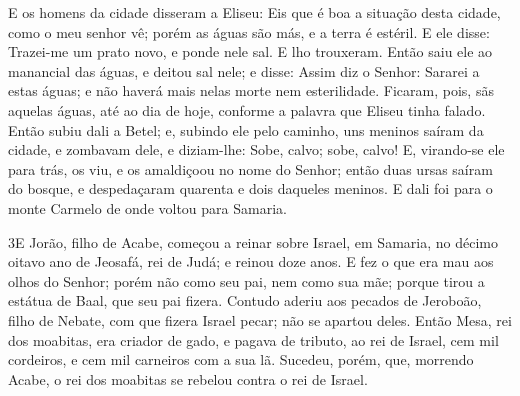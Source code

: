E os homens da cidade disseram a Eliseu: Eis que é boa a situação
desta cidade, como o meu senhor vê; porém as águas são más, e a
terra é estéril. E ele disse: Trazei-me um prato novo, e
ponde nele sal. E lho trouxeram. Então saiu ele ao manancial
das águas, e deitou sal nele; e disse: Assim diz o Senhor: Sararei a
estas águas; e não haverá mais nelas morte nem esterilidade.
Ficaram, pois, sãs aquelas águas, até ao dia de hoje,
conforme a palavra que Eliseu tinha falado. Então subiu dali
a Betel; e, subindo ele pelo caminho, uns meninos saíram da cidade,
e zombavam dele, e diziam-lhe: Sobe, calvo; sobe, calvo! E,
virando-se ele para trás, os viu, e os amaldiçoou no nome do Senhor;
então duas ursas saíram do bosque, e despedaçaram quarenta e dois
daqueles meninos. E dali foi para o monte Carmelo de onde
voltou para Samaria.

\medskip

\lettrine{3} E Jorão, filho de Acabe, começou a reinar sobre
Israel, em Samaria, no décimo oitavo ano de Jeosafá, rei de Judá; e
reinou doze anos. E fez o que era mau aos olhos do Senhor; porém
não como seu pai, nem como sua mãe; porque tirou a estátua de Baal,
que seu pai fizera. Contudo aderiu aos pecados de Jeroboão,
filho de Nebate, com que fizera Israel pecar; não se apartou deles.
Então Mesa, rei dos moabitas, era criador de gado, e pagava de
tributo, ao rei de Israel, cem mil cordeiros, e cem mil carneiros
com a sua lã. Sucedeu, porém, que, morrendo Acabe, o rei dos
moabitas se rebelou contra o rei de Israel.

